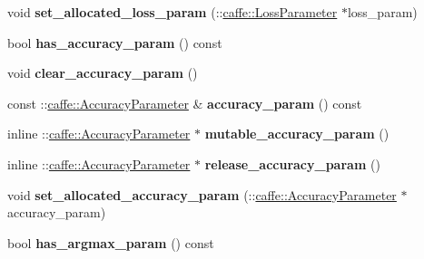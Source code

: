 \begin{DoxyCompactItemize}
\item 
\mbox{\label{classcaffe_1_1_layer_parameter_a262366794f09d511e72b77f1a646c638}} 
void {\bfseries set\+\_\+allocated\+\_\+loss\+\_\+param} (\+::\mbox{\hyperlink{classcaffe_1_1_loss_parameter}{caffe\+::\+Loss\+Parameter}} $\ast$loss\+\_\+param)
\item 
\mbox{\label{classcaffe_1_1_layer_parameter_a5e686131c73d2d8ddaaad4cc244728f0}} 
bool {\bfseries has\+\_\+accuracy\+\_\+param} () const
\item 
\mbox{\label{classcaffe_1_1_layer_parameter_af791fd1900df08eacd11bb872da776e1}} 
void {\bfseries clear\+\_\+accuracy\+\_\+param} ()
\item 
\mbox{\label{classcaffe_1_1_layer_parameter_a68bd1f345c423acc183ef237dab47fca}} 
const \+::\mbox{\hyperlink{classcaffe_1_1_accuracy_parameter}{caffe\+::\+Accuracy\+Parameter}} \& {\bfseries accuracy\+\_\+param} () const
\item 
\mbox{\label{classcaffe_1_1_layer_parameter_ac12f592623fb46348fed7e3b00a6129f}} 
inline \+::\mbox{\hyperlink{classcaffe_1_1_accuracy_parameter}{caffe\+::\+Accuracy\+Parameter}} $\ast$ {\bfseries mutable\+\_\+accuracy\+\_\+param} ()
\item 
\mbox{\label{classcaffe_1_1_layer_parameter_ae502c22ed28f242cc5fa866a53296ea6}} 
inline \+::\mbox{\hyperlink{classcaffe_1_1_accuracy_parameter}{caffe\+::\+Accuracy\+Parameter}} $\ast$ {\bfseries release\+\_\+accuracy\+\_\+param} ()
\item 
\mbox{\label{classcaffe_1_1_layer_parameter_a848c1ef02dad46102c808b7d4beca68f}} 
void {\bfseries set\+\_\+allocated\+\_\+accuracy\+\_\+param} (\+::\mbox{\hyperlink{classcaffe_1_1_accuracy_parameter}{caffe\+::\+Accuracy\+Parameter}} $\ast$accuracy\+\_\+param)
\item 
\mbox{\label{classcaffe_1_1_layer_parameter_a5f338d11bb89ad086b5821dcb03762d9}} 
bool {\bfseries has\+\_\+argmax\+\_\+param} () const
\item 

\end{DoxyCompactItemize}
